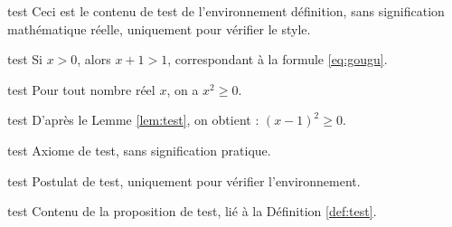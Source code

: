 \documentclass[fr]{../../elegantbook}
\begin{document}
\ifdefined\simpleTest
\begin{definition}\label{def:test}
\else
\begin{definition}{test}
\fi
Ceci est le contenu de test de l'environnement définition, sans signification mathématique réelle, uniquement pour vérifier le style.
\end{definition}

\ifdefined\simpleTest
\begin{theorem}\label{thm:test}
\else
\begin{theorem}{test}
\fi
Si $x>0$, alors $x+1>1$, correspondant à la formule \eqref{eq:gougu}.
\end{theorem}

\ifdefined\simpleTest
\begin{lemma}\label{lem:test}
\else
\begin{lemma}{test}
\fi
Pour tout nombre réel $x$, on a $x^2\geq0$.
\end{lemma}

\ifdefined\simpleTest
\begin{corollary}\label{cor:test}
\else
\begin{corollary}{test}
\fi
D'après le Lemme \ref{lem:test}, on obtient : $(x-1)^2\geq0$.
\end{corollary}

\ifdefined\simpleTest
\begin{axiom}\label{axi:test}
\else
\begin{axiom}{test}
\fi
Axiome de test, sans signification pratique.
\end{axiom}

\ifdefined\simpleTest
\begin{postulate}\label{pos:test}
\else
\begin{postulate}{test}
\fi
Postulat de test, uniquement pour vérifier l'environnement.
\end{postulate}

\ifdefined\simpleTest
\begin{proposition}\label{pro:test}
\else
\begin{proposition}{test}
\fi
Contenu de la proposition de test, lié à la Définition \ref{def:test}.
\end{proposition}


\end{proposition}
\end{postulate}
\end{axiom}
\end{corollary}
\end{lemma}
\end{theorem}
\end{definition}
\end{document}
